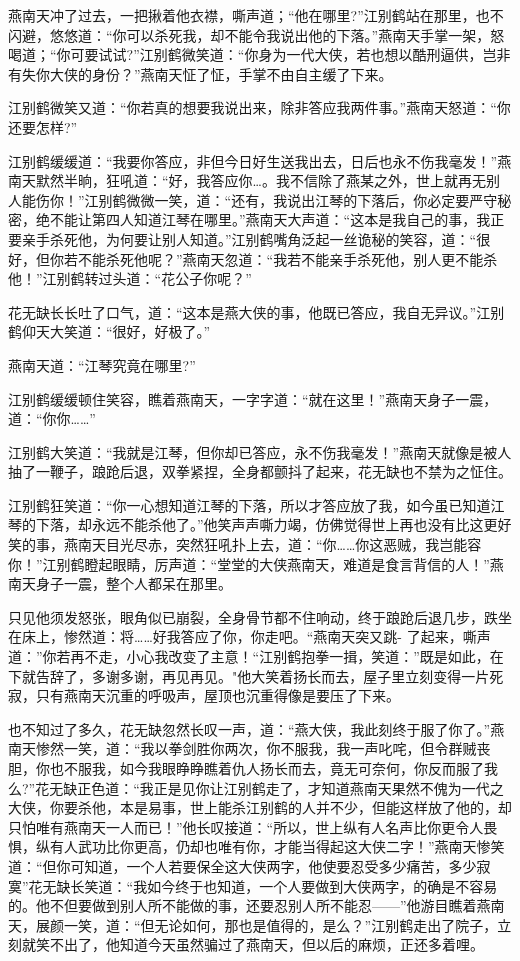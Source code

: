 \documentclass[12pt,oneside]{book}
\begin{document}
燕南天冲了过去，一把揪着他衣襟，嘶声道；``他在哪里?''江别鹤站在那里，也不闪避，悠悠道：``你可以杀死我，却不能令我说出他的下落。''燕南天手掌一架，怒喝道；``你可要试试?''江别鹤微笑道：``你身为一代大侠，若也想以酷刑逼供，岂非有失你大侠的身份？''燕南天怔了怔，手掌不由自主缓了下来。

江别鹤微笑又道：``你若真的想要我说出来，除非答应我两件事。''燕南天怒道：``你还要怎样?''

江别鹤缓缓道：``我要你答应，非但今日好生送我出去，日后也永不伤我毫发！''燕南天默然半晌，狂吼道：``好，我答应你\ldots。我不信除了燕某之外，世上就再无别人能伤你！''江别鹤微微一笑，道：``还有，我说出江琴的下落后，你必定要严守秘密，绝不能让第四人知道江琴在哪里。''燕南天大声道：``这本是我自己的事，我正要亲手杀死他，为何要让别人知道。''江别鹤嘴角泛起一丝诡秘的笑容，道：``很好，但你若不能杀死他呢？''燕南天忽道：``我若不能亲手杀死他，别人更不能杀他！''江别鹤转过头道：``花公子你呢？''

花无缺长长吐了口气，道：``这本是燕大侠的事，他既已答应，我自无异议。''江别鹤仰天大笑道：``很好，好极了。''

燕南天道：``江琴究竟在哪里?''

江别鹤缓缓顿住笑容，瞧着燕南天，一字字道：``就在这里！''燕南天身子一震，道：``你你\ldots\ldots{}''

江别鹤大笑道：``我就是江琴，但你却已答应，永不伤我毫发！''燕南天就像是被人抽了一鞭子，踉跄后退，双拳紧捏，全身都颤抖了起来，花无缺也不禁为之怔住。

江别鹤狂笑道：``你一心想知道江琴的下落，所以才答应放了我，如今虽已知道江琴的下落，却永远不能杀他了。''他笑声声嘶力竭，仿佛觉得世上再也没有比这更好笑的事，燕南天目光尽赤，突然狂吼扑上去，道：``你\ldots\ldots 你这恶贼，我岂能容你！''江别鹤瞪起眼睛，厉声道：``堂堂的大侠燕南天，难道是食言背信的人！''燕南天身子一震，整个人都呆在那里。

只见他须发怒张，眼角似已崩裂，全身骨节都不住响动，终于踉跄后退几步，跌坐在床上，惨然道：将\ldots\ldots 好我答应了你，你走吧。``燕南天突又跳-
了起来，嘶声道：''你若再不走，小心我改变了主意！``江别鹤抱拳一揖，笑道：''既是如此，在下就告辞了，多谢多谢，再见再见。"他大笑着扬长而去，屋子里立刻变得一片死寂，只有燕南天沉重的呼吸声，屋顶也沉重得像是要压了下来。

也不知过了多久，花无缺忽然长叹一声，道：``燕大侠，我此刻终于服了你了。''燕南天惨然一笑，道：``我以拳剑胜你两次，你不服我，我一声叱咤，但令群贼丧胆，你也不服我，如今我眼睁睁瞧着仇人扬长而去，竟无可奈何，你反而服了我么?''花无缺正色道：``我正是见你让江别鹤走了，才知道燕南天果然不傀为一代之大侠，你要杀他，本是易事，世上能杀江别鹤的人并不少，但能这样放了他的，却只怕唯有燕南天一人而已！''他长叹接道：``所以，世上纵有人名声比你更令人畏惧，纵有人武功比你更高，仍却也唯有你，才能当得起这大侠二字！''燕南天惨笑道：``但你可知道，一个人若要保全这大侠两字，他使要忍受多少痛苦，多少寂寞''花无缺长笑道：``我如今终于也知道，一个人要做到大侠两字，的确是不容易的。他不但要做到别人所不能做的事，还要忍别人所不能忍------''他游目瞧着燕南天，展颜一笑，道：``但无论如何，那也是值得的，是么？''江别鹤走出了院子，立刻就笑不出了，他知道今天虽然骗过了燕南天，但以后的麻烦，正还多着哩。
\end{document}
